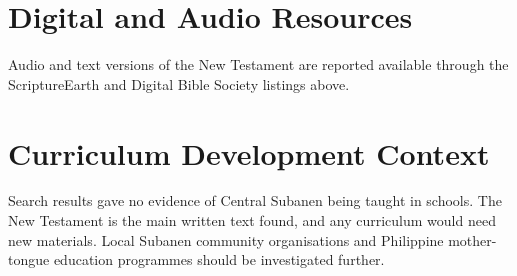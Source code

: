 \documentclass[12pt]{article}
\begin{document}
\section{Digital and Audio Resources}
Audio and text versions of the New Testament are reported available through the ScriptureEarth and Digital Bible Society listings above.

\section{Curriculum Development Context}
Search results gave no evidence of Central Subanen being taught in schools. The New Testament is the main written text found, and any curriculum would need new materials. Local Subanen community organisations and Philippine mother-tongue education programmes should be investigated further.
\end{document}
